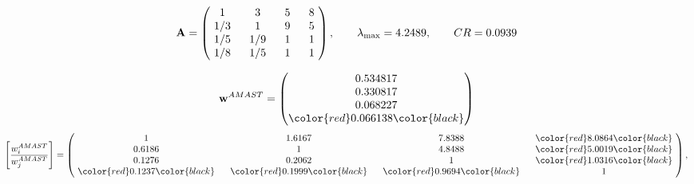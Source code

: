 \begin{example}
\begin{equation*}
\mathbf{A} =
\begin{pmatrix}
$\,\,$ 1 $\,\,$ & $\,\,$3$\,\,$ & $\,\,$5$\,\,$ & $\,\,$8 $\,\,$ \\
$\,\,$ 1/3$\,\,$ & $\,\,$ 1 $\,\,$ & $\,\,$9$\,\,$ & $\,\,$5 $\,\,$ \\
$\,\,$ 1/5$\,\,$ & $\,\,$ 1/9$\,\,$ & $\,\,$ 1 $\,\,$ & $\,\,$1 $\,\,$ \\
$\,\,$ 1/8$\,\,$ & $\,\,$ 1/5$\,\,$ & $\,\,$ 1 $\,\,$ & $\,\,$ 1  $\,\,$ \\
\end{pmatrix},
\qquad
\lambda_{\max} =
4.2489,
\qquad
CR = 0.0939
\end{equation*}

\begin{equation*}
\mathbf{w}^{AMAST} =
\begin{pmatrix}
0.534817\\
0.330817\\
0.068227\\
\color{red} 0.066138\color{black}
\end{pmatrix}\end{equation*}
\begin{equation*}
\left[ \frac{{w}^{AMAST}_i}{{w}^{AMAST}_j} \right] =
\begin{pmatrix}
$\,\,$ 1 $\,\,$ & $\,\,$1.6167$\,\,$ & $\,\,$7.8388$\,\,$ & $\,\,$\color{red} 8.0864\color{black} $\,\,$ \\
$\,\,$0.6186$\,\,$ & $\,\,$ 1 $\,\,$ & $\,\,$4.8488$\,\,$ & $\,\,$\color{red} 5.0019\color{black}   $\,\,$ \\
$\,\,$0.1276$\,\,$ & $\,\,$0.2062$\,\,$ & $\,\,$ 1 $\,\,$ & $\,\,$\color{red} 1.0316\color{black}  $\,\,$ \\
$\,\,$\color{red} 0.1237\color{black} $\,\,$ & $\,\,$\color{red} 0.1999\color{black} $\,\,$ & $\,\,$\color{red} 0.9694\color{black} $\,\,$ & $\,\,$ 1  $\,\,$ \\
\end{pmatrix},
\end{equation*}


\end{example}
